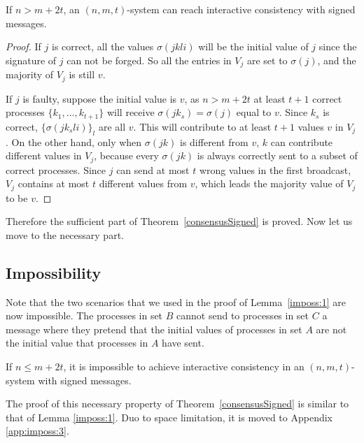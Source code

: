 \begin{lemma}
  If $n>m+2t$, an  $(n,m,t)$-system can reach interactive consistency with signed
  messages.
\end{lemma}

\begin{proof}
  If $j$ is correct, all the values $\sigma ( j k l i )$ will be the
  initial value of $j$ since the signature of $j$ can not be forged. So all the entries in $V_j$ are set to $\sigma (j)$, and the majority of $V_{j}$ is still $v$.
  
  If $j$ is faulty, suppose the initial value is $v$, as $n>m+2t$ at least $t+1$
  correct processes $\{k_1,...,k_{t+1}\}$ will receive $\sigma( j  k_{s}) = \sigma(j)$ equal to $v$. Since $k_s$ is correct, $\{\sigma(j k_s l i)\}_l$ are all $v$. This
  will contribute to at least $t+1$ values $v$ in $V_{j}$. On the other
  hand, only when $\sigma ( j k )$ is different from
  $v$, $k$ can contribute different values in $V_{j}$, because every $\sigma(j k)$ is always correctly sent to a subset of correct processes. Since $j$ can send at
  most $t$ wrong values in the first broadcast, $V_{j}$ contains at most $t$
  different values from $v$, which leads the majority value of $V_{j}$ to be
  $v$.
\end{proof}

Therefore the sufficient part of Theorem~\ref{consensusSigned} is proved. Now let us move to the necessary part.

\subsection{Impossibility}

Note that the two scenarios that we used in the proof of Lemma~\ref{imposs:1}
are now impossible. The processes in set $B$ cannot send to processes in set $C$ a message 
where they pretend that the initial values of processes in set $A$ are not the initial value that processes in $A$ have sent.

\begin{lemma}\label{imposs:3}
  If $n \leqslant m+2t$, it is impossible to achieve interactive consistency in an $(n,m,t)$-system with signed messages.
\end{lemma}


The proof of this necessary property of Theorem~\ref{consensusSigned} is similar to that of Lemma \ref{imposs:1}. Duo to space limitation, it is moved to Appendix \ref{app:imposs:3}.
